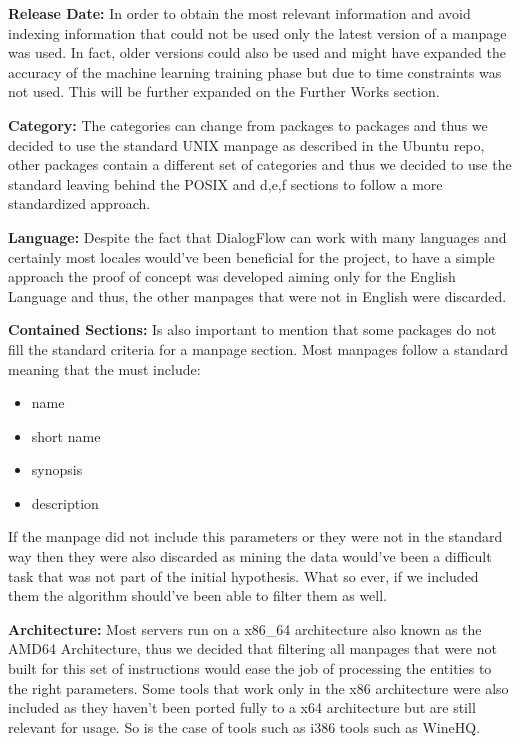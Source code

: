 \textbf{Release Date:}
In order to obtain the most relevant information and avoid indexing information that could not be used only the latest version of a manpage was used. In fact, older versions could also be used and might have expanded the accuracy of the machine learning training phase but due to time constraints was not used. This will be further expanded on the Further Works section.

\textbf{Category:}
The categories can change from packages to packages and thus we decided to use the standard UNIX manpage as described in the Ubuntu repo, other packages contain a different set of categories and thus we decided to use the standard leaving behind the POSIX and d,e,f sections to follow a more standardized approach.

\textbf{Language:}
Despite the fact that DialogFlow can work with many languages and certainly most locales would've been beneficial for the project, to have a simple approach the proof of concept was developed aiming only for the English Language and thus, the other manpages that were not in English were discarded.

\textbf{Contained Sections:}
Is also important to mention that some packages do not fill the standard criteria for a manpage section. Most manpages follow a standard meaning that the must include:
\begin{itemize}
    \item name
    \item short name
    \item synopsis
    \item description
\end{itemize}{}

If the manpage did not include this parameters or they were not in the standard way then they were also discarded as mining the data would've been a difficult task that was not part of the initial hypothesis. What so ever, if we included them the algorithm should've been able to filter them as well.

\textbf{Architecture:}
Most servers run on a x86\_64 architecture also known as the AMD64 Architecture, thus we decided that filtering all manpages that were not built for this set of instructions would ease the job of processing the entities to the right parameters. Some tools that work only in the x86 architecture were also included as they haven't been ported fully to a x64 architecture but are still relevant for usage. So is the case of tools such as i386 tools such as WineHQ.

